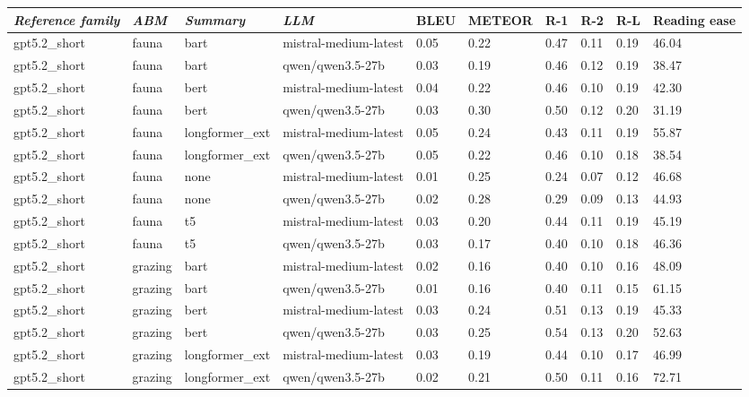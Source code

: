 \begin{tabular}{|l|l|l|l|l|l|l|l|l|l|}
\hline
\textit{\textbf{Reference family}} & \textit{\textbf{ABM}} & \textit{\textbf{Summary}} & \textit{\textbf{LLM}} & BLEU & METEOR & R-1 & R-2 & R-L & Reading ease \\
 \hline
 gpt5.2\_short & fauna & bart & mistral-medium-latest & 0.05 & 0.22 & 0.47 & 0.11 & 0.19 & 46.04 \\
 \hline
 gpt5.2\_short & fauna & bart & qwen/qwen3.5-27b & 0.03 & 0.19 & 0.46 & 0.12 & 0.19 & 38.47 \\
 \hline
 gpt5.2\_short & fauna & bert & mistral-medium-latest & 0.04 & 0.22 & 0.46 & 0.10 & 0.19 & 42.30 \\
 \hline
 gpt5.2\_short & fauna & bert & qwen/qwen3.5-27b & 0.03 & 0.30 & 0.50 & 0.12 & 0.20 & 31.19 \\
 \hline
 gpt5.2\_short & fauna & longformer\_ext & mistral-medium-latest & 0.05 & 0.24 & 0.43 & 0.11 & 0.19 & 55.87 \\
 \hline
 gpt5.2\_short & fauna & longformer\_ext & qwen/qwen3.5-27b & 0.05 & 0.22 & 0.46 & 0.10 & 0.18 & 38.54 \\
 \hline
 gpt5.2\_short & fauna & none & mistral-medium-latest & 0.01 & 0.25 & 0.24 & 0.07 & 0.12 & 46.68 \\
 \hline
 gpt5.2\_short & fauna & none & qwen/qwen3.5-27b & 0.02 & 0.28 & 0.29 & 0.09 & 0.13 & 44.93 \\
 \hline
 gpt5.2\_short & fauna & t5 & mistral-medium-latest & 0.03 & 0.20 & 0.44 & 0.11 & 0.19 & 45.19 \\
 \hline
 gpt5.2\_short & fauna & t5 & qwen/qwen3.5-27b & 0.03 & 0.17 & 0.40 & 0.10 & 0.18 & 46.36 \\
 \hline
 gpt5.2\_short & grazing & bart & mistral-medium-latest & 0.02 & 0.16 & 0.40 & 0.10 & 0.16 & 48.09 \\
 \hline
 gpt5.2\_short & grazing & bart & qwen/qwen3.5-27b & 0.01 & 0.16 & 0.40 & 0.11 & 0.15 & 61.15 \\
 \hline
 gpt5.2\_short & grazing & bert & mistral-medium-latest & 0.03 & 0.24 & 0.51 & 0.13 & 0.19 & 45.33 \\
 \hline
 gpt5.2\_short & grazing & bert & qwen/qwen3.5-27b & 0.03 & 0.25 & 0.54 & 0.13 & 0.20 & 52.63 \\
 \hline
 gpt5.2\_short & grazing & longformer\_ext & mistral-medium-latest & 0.03 & 0.19 & 0.44 & 0.10 & 0.17 & 46.99 \\
 \hline
 gpt5.2\_short & grazing & longformer\_ext & qwen/qwen3.5-27b & 0.02 & 0.21 & 0.50 & 0.11 & 0.16 & 72.71 \\

\end{tabular}
